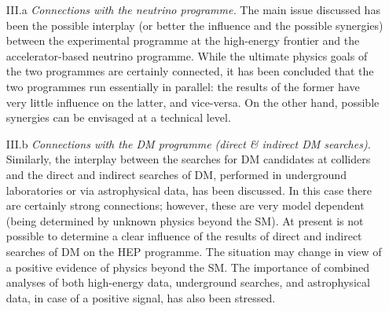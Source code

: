 \begin{enumerate}
\item[III.a] {\em Connections with the neutrino programme.} 
The main issue discussed has been the possible interplay (or better the influence and the possible synergies) between
the experimental programme at the high-energy frontier and the accelerator-based neutrino programme. 
While the ultimate physics goals of the two programmes are certainly connected, it has been concluded that the two programmes 
run essentially in parallel: the results of the former have very little influence on the latter, and vice-versa. On the other hand,
possible synergies can be envisaged at a technical level. 

\item[III.b] {\em Connections with the DM programme (direct \& indirect DM searches).} 
Similarly,  the interplay between the searches for DM candidates at colliders 
and the direct and indirect searches of DM, performed in underground laboratories 
or via astrophysical data,  has been discussed. 
In this case there are certainly strong connections;  however, these are very model dependent
(being determined by unknown physics beyond the SM). 
At present is not possible to determine a clear influence of the results of 
direct and indirect searches of DM on the HEP programme. The situation may change in view of a positive evidence of physics beyond the SM. 
The importance of combined analyses of both high-energy data, underground searches, and astrophysical data,
in case of a positive signal, has also been stressed.

\end{enumerate}
